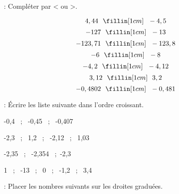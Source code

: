  : Compléter par < ou >. %

\begin{multicols}{4}
    $$4,44~~\fillin[1cm]~~-4,5$$ 
    $$-127~~\fillin[1cm]~~ -13$$
    $$-123,71~~\fillin[1cm]~~ -123,8$$
    $$-6~~\fillin[1cm]~~ -8$$
    $$-4,2~~\fillin[1cm]~~ -4,12$$    
    $$ 3,12 ~~\fillin[1cm]~~ 3,2$$
    $$-0,4802~~\fillin[1cm]~~ -0,481$$
\end{multicols}

 : Écrire les liste suivante dans l'ordre croissant. %

\begin{multicols}{4}
    \begin{center}
    -0,4 ~;~ -0,45 ~;~ -0,407 \vspace{3cm}
    
    -2,3 ~;~ 1,2 ~;~ -2,12 ~;~ 1,03 \vspace{3cm}
    
    -2,35 ~;~ -2,354  ~;~-2,3 \vspace{3cm}
    
    1 ~;~ -13 ~;~ 0 ~;~ -1,2 ~;~ 3,4 \vspace{3cm}
    \end{center}
\end{multicols}

 : Placer les nombres suivants sur les droites graduées. %

